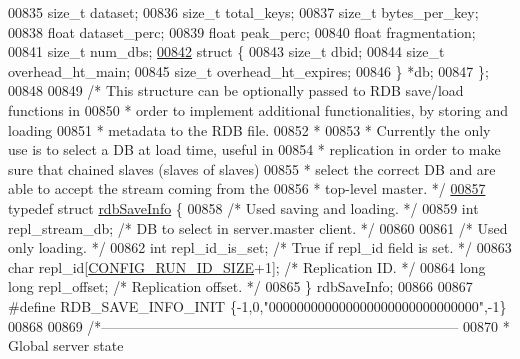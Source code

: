 \begin{DoxyCode}
{{{{{{00835     size\_t dataset;
00836     size\_t total\_keys;
00837     size\_t bytes\_per\_key;
00838     \textcolor{keywordtype}{float} dataset\_perc;
00839     \textcolor{keywordtype}{float} peak\_perc;
00840     \textcolor{keywordtype}{float} fragmentation;
00841     size\_t num\_dbs;
\hyperlink{structredisMemOverhead_8db}{00842}     \textcolor{keyword}{struct} \{
00843         size\_t dbid;
00844         size\_t overhead\_ht\_main;
00845         size\_t overhead\_ht\_expires;
00846     \} *db;
00847 \};
00848 
00849 \textcolor{comment}{/* This structure can be optionally passed to RDB save/load functions in}
00850 \textcolor{comment}{ * order to implement additional functionalities, by storing and loading}
00851 \textcolor{comment}{ * metadata to the RDB file.}
00852 \textcolor{comment}{ *}
00853 \textcolor{comment}{ * Currently the only use is to select a DB at load time, useful in}
00854 \textcolor{comment}{ * replication in order to make sure that chained slaves (slaves of slaves)}
00855 \textcolor{comment}{ * select the correct DB and are able to accept the stream coming from the}
00856 \textcolor{comment}{ * top-level master. */}
\hyperlink{structrdbSaveInfo}{00857} \textcolor{keyword}{typedef} \textcolor{keyword}{struct} \hyperlink{structrdbSaveInfo}{rdbSaveInfo} \{
00858     \textcolor{comment}{/* Used saving and loading. */}
00859     \textcolor{keywordtype}{int} repl\_stream\_db;  \textcolor{comment}{/* DB to select in server.master client. */}
00860 
00861     \textcolor{comment}{/* Used only loading. */}
00862     \textcolor{keywordtype}{int} repl\_id\_is\_set;  \textcolor{comment}{/* True if repl\_id field is set. */}
00863     \textcolor{keywordtype}{char} repl\_id[\hyperlink{server_8h_aba6794fa3ee28f85165eaed93190f1df}{CONFIG\_RUN\_ID\_SIZE}+1];     \textcolor{comment}{/* Replication ID. */}
00864     \textcolor{keywordtype}{long} \textcolor{keywordtype}{long} repl\_offset;                  \textcolor{comment}{/* Replication offset. */}
00865 \} rdbSaveInfo;
00866 
00867 \textcolor{preprocessor}{#}\textcolor{preprocessor}{define} \textcolor{preprocessor}{RDB\_SAVE\_INFO\_INIT} \textcolor{preprocessor}{\{}\textcolor{preprocessor}{-}1\textcolor{preprocessor}{,}0\textcolor{preprocessor}{,}\textcolor{stringliteral}{"000000000000000000000000000000"}\textcolor{preprocessor}{,}\textcolor{preprocessor}{-}1\textcolor{preprocessor}{\}}
00868 
00869 \textcolor{comment}{/*-----------------------------------------------------------------------------}
00870 \textcolor{comment}{ * Global server state}
}}}}}}
\end{DoxyCode}
